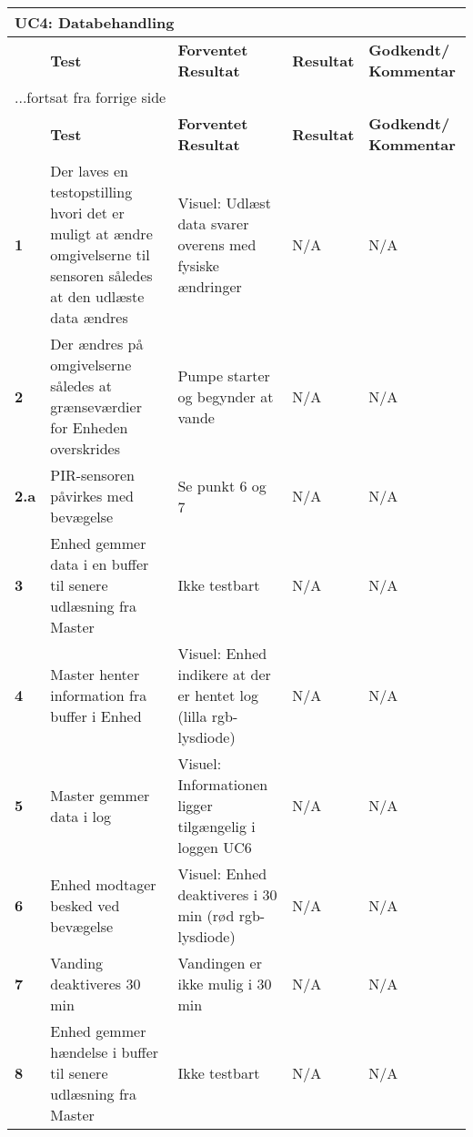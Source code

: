 
\begin{center}
\begin{longtable}{|p{}|p{}|p{}|p{}|p{}|} %
\hline
\multicolumn{5}{|l|}{\textbf{UC4: Databehandling}} \\ \hline
\multicolumn{1}{|c|}{} &
\textbf{Test} &
\textbf{Forventet \newline Resultat} &
\textbf{Resultat} &
\textbf{Godkendt/ \newline Kommentar} \\ \hline 
\endfirsthead

\multicolumn{5}{l}{...fortsat fra forrige side} \\ \hline 
\multicolumn{1}{|c|}{} &
\textbf{Test} &
\textbf{Forventet \newline Resultat} &
\textbf{Resultat} &
\textbf{Godkendt/ \newline Kommentar} \\ \hline 
\endhead

\textbf{1}	&Der laves en testopstilling hvori det er muligt at ændre omgivelserne til sensoren således at den udlæste data ændres
			&Visuel: Udlæst data svarer overens med fysiske ændringer
			&N/A
			&N/A \\ \hline 
			
\textbf{2}	&Der ændres på omgivelserne således at grænseværdier for Enheden overskrides
			&Pumpe starter og begynder at vande
			&N/A
			&N/A \\ \hline 
			
\textbf{2.a}	&PIR-sensoren påvirkes med bevægelse
			&Se punkt 6 og 7
			&N/A
			&N/A \\ \hline 
			
\textbf{3}	&Enhed gemmer data i en buffer til senere udlæsning fra Master
			&Ikke testbart
			&N/A
			&N/A \\ \hline 

\textbf{4}	&Master henter information fra buffer i Enhed
			&Visuel: Enhed indikere at der er hentet log (lilla rgb-lysdiode)
			&N/A
			&N/A \\ \hline 
			
\textbf{5}	&Master gemmer data i log 
			&Visuel: Informationen ligger tilgængelig i loggen UC6
			&N/A
			&N/A \\ \hline 
			
\textbf{6}	&Enhed modtager besked ved bevægelse
			&Visuel: Enhed deaktiveres i 30 min (rød rgb-lysdiode)
			&N/A
			&N/A \\ \hline 
			
\textbf{7}	&Vanding deaktiveres 30 min
			&Vandingen er ikke mulig i 30 min
			&N/A
			&N/A \\ \hline 
			
\textbf{8}	&Enhed gemmer hændelse i buffer til senere udlæsning fra Master
			&Ikke testbart
			&N/A
			&N/A \\ \hline 					
			
\end{longtable}
	\label{ATUC4} 
\end{center}
